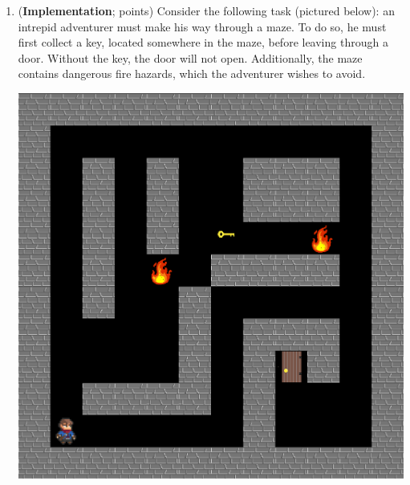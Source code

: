 \documentclass{article}
\newcounter{totalpoints}
\newcommand{\question}[2][]{(\textbf{#2}; \subtotal{#1})}
\newcommand{\subtotal}[1]{\newcounter{#1}\setcounter{#1}{0}\regtotcounter{#1}\total{#1} points}
\newcommand{\points}[2][]{{\addtocounter{totalpoints}{#2}\ifx&#1&\else\addtocounter{#1}{#2}\fi\textbf{[#2 points]}}}
\begin{document}
\begin{enumerate}
Now suppose that starting from state $S_t=W$, the current behaviour policy selects action $A_{t}=a$, leading to reward $R_{t+1}=4$ and a transition to state $S_{t+1}=X$.  The behaviour policy then selects action $A_{t+1}=a$.

\begin{enumerate}
\item \points[td-q]{6}
What is the updated estimate for $Q(W,a)$ according to the $Q$-learning algorithm?
Assume a step size of $\alpha=0.5$ and a discount rate of $\gamma=1$.
\begin{answer}{1.5in}
\end{answer}

\item \points[td-q]{6}
What is the updated estimate for $Q(W,a)$ according to the Sarsa algorithm?
Assume a step size of $\alpha=0.5$ and a discount rate of $\gamma=1$.
\begin{answer}{1.5in}
\end{answer}

\end{enumerate}





\item \question[code]{Implementation}
\label{q:code}
Consider the following task (pictured below): an intrepid adventurer must make his way through a maze. To do so, he must first collect  a key, located somewhere in the maze, before leaving through a door. Without the key, the door will not open. Additionally, the maze contains dangerous fire hazards, which the adventurer wishes to avoid.

\begin{center}
\includegraphics[width=0.5\columnwidth]{code-qlearning.png}
\end{center}


\end{enumerate}
\end{document}
